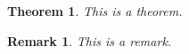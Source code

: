 \documentclass{article}
\theoremstyle{break}
\newtheorem{theorem}{Theorem}
\theoremstyle{plain1}
\newtheorem{remark}{Remark}
\begin{document}
\begin{theorem}
  This is a theorem.
\end{theorem}
\begin{remark}
  This is a remark.
\end{remark}
\end{document}
